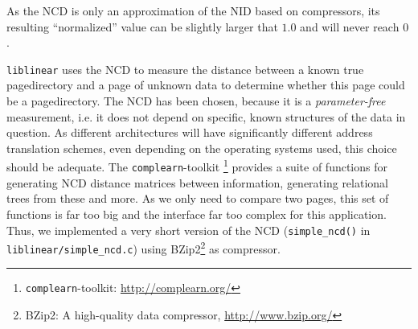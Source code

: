 As the NCD is only an approximation of the NID based on compressors, its
resulting ``normalized'' value can be slightly larger that $1.0$ and will never
reach $0$.

\texttt{liblinear} uses the NCD to measure the distance between a known true
pagedirectory and a page of unknown data to determine whether this page could be
a pagedirectory. The NCD has been chosen, because it is a \emph{parameter-free}
measurement, i.e\@. it does not depend on specific, known structures of the data
in question. As different architectures will have significantly different
address translation schemes, even depending on the operating systems used, this
choice should be adequate. The \texttt{complearn}-toolkit
\footnote{\texttt{complearn}-toolkit:
\href{http://complearn.org/}{http://complearn.org/}} provides a suite of
functions for generating NCD distance matrices between information, generating
relational trees from these and more. As we only need to compare two pages, this
set of functions is far too big and the interface far too complex for this
application. Thus, we implemented a very short version of the NCD
(\texttt{simple\_ncd()} in \texttt{liblinear/simple\_ncd.c}) using
BZip2\footnote{BZip2: A high-quality data compressor,
\href{http://www.bzip.org/}{http://www.bzip.org/}} as compressor.

